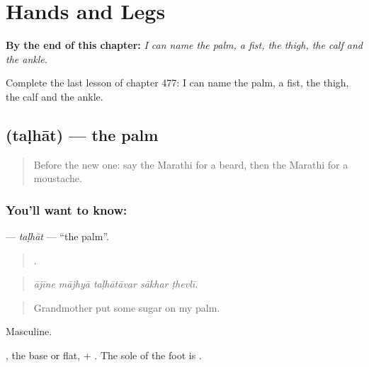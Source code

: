 
\chapter{Hands and Legs}
\label{ch:mr-hands-and-legs}

\begin{chapteropening}
\textbf{By the end of this chapter:} \emph{I can name the palm, a fist, the thigh, the calf and the ankle.}

Complete the last lesson of chapter 477: I can name the palm, a fist, the thigh, the calf and the ankle.
\end{chapteropening}

\section[\texorpdfstring{\mr{तळहात} (taḷhāt)}{तळहात (taḷhāt)}]{ (taḷhāt) — the palm}

\label{lesson:MR-C477-talhat}



\begin{quote}
Before the new one: say the Marathi for a beard, then the Marathi for a moustache.
\end{quote}

\subsection*{You'll want to know: }
\textbf{} — \emph{taḷhāt} — \textquotedblleft{}the palm\textquotedblright{}.

\begin{quote}
    .
\end{quote}

\begin{quote}
\emph{ājīne mājhyā taḷhātāvar sākhar ṭhevlī.}
\end{quote}

\begin{quote}
Grandmother put some sugar on my palm.
\end{quote}

Masculine.

, the base or flat, + . The sole of the foot is .

